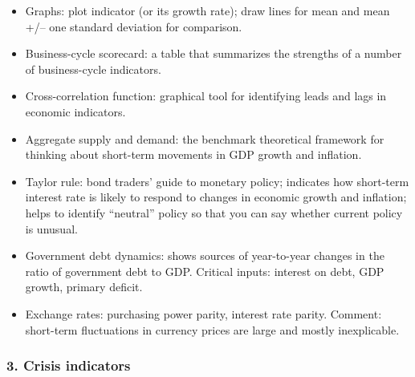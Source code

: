 \documentclass[letterpaper,12pt]{article}
\begin{document}
\begin{itemize}
\item Graphs:  plot indicator (or its growth rate);
    draw lines for mean and mean +/-- one standard deviation
    for comparison.

\item Business-cycle scorecard:  a table that summarizes
the strengths of a number of business-cycle indicators.

\item Cross-correlation function:  graphical tool for identifying leads and lags in economic indicators.
\item Aggregate supply and demand:  the benchmark theoretical framework for thinking about short-term movements in GDP growth and inflation.
\item Taylor rule:  bond traders' guide to monetary policy; indicates how
    short-term
    interest rate is likely to respond to changes in economic growth and inflation; helps to identify ``neutral'' policy so that you can say whether current policy is unusual.
\item Government debt dynamics:  shows sources of year-to-year changes in the ratio of government debt to GDP.  Critical inputs:  interest on debt, GDP growth, primary deficit.
\item Exchange rates:  purchasing power parity, interest rate parity.
    Comment:  short-term fluctuations in currency prices are
    large and mostly inexplicable.
\end{itemize}


\subsubsection*{3. Crisis indicators}
\end{document}

